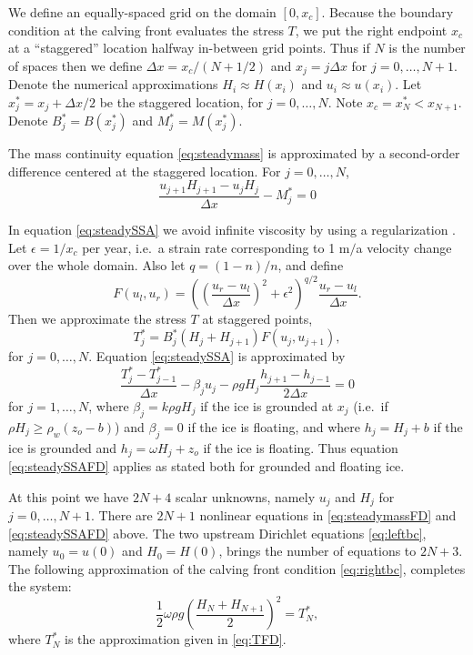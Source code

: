 \documentclass[twocolumn,letterpaper]{igs}
\newcommand{\eps}{\epsilon}
\begin{document}
We define an equally-spaced grid on the domain $[0,x_c]$.  Because the boundary condition at the calving front evaluates the stress $T$, we put the right endpoint $x_c$ at a ``staggered'' location halfway in-between grid points.  Thus if $N$ is the number of spaces then we define $\Delta x = x_c / (N+1/2)$ and $x_j = j\Delta x$ for $j=0,\dots,N+1$.  Denote the numerical approximations $H_i\approx H(x_i)$ and $u_i \approx u(x_i)$.  Let $x_j^* = x_j + \Delta x/2$ be the staggered location, for $j=0,\dots,N$.  Note $x_c = x_N^* < x_{N+1}$.  Denote $B_j^*=B(x_j^*)$ and $M_j^*=M(x_j^*)$.

The mass continuity equation \eqref{eq:steadymass} is approximated by a second-order difference centered at the staggered location.  For $j=0,\dots,N$,
\begin{equation}
\frac{u_{j+1} H_{j+1} - u_j H_j}{\Delta x} - M_j^* = 0 \label{eq:steadymassFD}
\end{equation}

In equation \eqref{eq:steadySSA} we avoid infinite viscosity by using a regularization \citep{SchoofStream}.  Let $\eps=1/x_c$ per year, i.e.~a strain rate corresponding to 1 m$/$a velocity change over the whole domain.  Also let $q = (1-n)/n$, and define
\begin{equation}
F(u_l,u_r) = \left(\left(\frac{u_r-u_l}{\Delta x}\right)^2 + \eps^2\right)^{q/2} \frac{u_r-u_l}{\Delta x}. \label{eq:viscregFD}
\end{equation}
Then we approximate the stress $T$ at staggered points,
\begin{equation}
T_{j}^* = B_j^* \left(H_j + H_{j+1}\right) F(u_j,u_{j+1}), \label{eq:TFD}
\end{equation}
for $j=0,\dots,N$.  Equation \eqref{eq:steadySSA} is approximated by
\begin{equation}
\frac{T_{j}^* - T_{j-1}^*}{\Delta x} - \beta_j u_j - \rho g H_j \frac{h_{j+1} - h_{j-1}}{2 \Delta x} = 0 \label{eq:steadySSAFD}
\end{equation}
for $j=1,\dots,N$, where $\beta_j = k \rho g H_j$ if the ice is grounded at $x_j$ (i.e.~if $\rho H_j \ge \rho_w (z_o - b)$) and $\beta_j=0$ if the ice is floating, and where $h_j = H_j + b$ if the ice is grounded and $h_j = \omega H_j + z_o$ if the ice is floating.  Thus equation \eqref{eq:steadySSAFD} applies as stated both for grounded and floating ice.

At this point we have $2N+4$ scalar unknowns, namely $u_j$ and $H_j$ for $j=0,\dots,N+1$.  There are $2N+1$ nonlinear equations in \eqref{eq:steadymassFD} and \eqref{eq:steadySSAFD} above.  The two upstream Dirichlet equations \eqref{eq:leftbc}, namely $u_0=u(0)$ and $H_0=H(0)$, brings the number of equations to $2N+3$.  The following approximation of the calving front condition \eqref{eq:rightbc}, completes the system:
\begin{equation}
\frac{1}{2} \omega \rho g \left(\frac{H_N + H_{N+1}}{2}\right)^2 = T_N^*, \label{eq:rightbcFD}
\end{equation}
where $T_N^*$ is the approximation given in \eqref{eq:TFD}.
\end{document}
